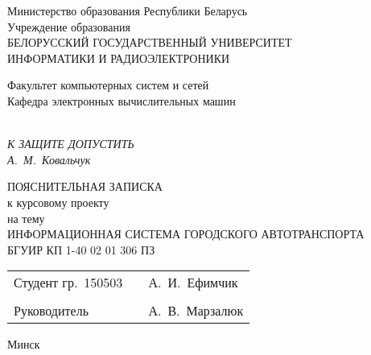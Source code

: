 \begin{titlepage}
    \begin{center}
      Министерство образования Республики Беларусь\\[1em]
      Учреждение образования\\
      БЕЛОРУССКИЙ ГОСУДАРСТВЕННЫЙ УНИВЕРСИТЕТ\\
      ИНФОРМАТИКИ И РАДИОЭЛЕКТРОНИКИ\\[2em]
  
      \begin{minipage}{\textwidth}
        \begin{flushleft}
          Факультет компьютерных систем и сетей\\[1em]
          Кафедра электронных вычислительных машин\\[1em]
        \end{flushleft}
      \end{minipage}\\[1em]

        \vspace{3em}
        \hfill 
        \textit{\MakeUppercase{К защите допустить}}\\
        \vspace{0.6em}
        \hfill 
        \underline{\hspace{2.3cm}}\textit{А.~М.~Ковальчук}
      
      \vfill
        ПОЯСНИТЕЛЬНАЯ ЗАПИСКА \\
        к курсовому проекту \\
        на тему \\
        \MakeUppercase{информационная система городского автотранспорта} \\ 
        БГУИР КП 1-40 02 01 306 ПЗ \\

      \vfill

      \begin{tabular}{p{}p{}p{}}
        Студент гр.~150503     &&   А.~И.~Ефимчик    \\
                               &&                    \\
        Руководитель           &&   А.~В.~Марзалюк   \\
      \end{tabular}
      
      \vfill

      {\normalsize Минск \the\year}
    \end{center}
\end{titlepage}